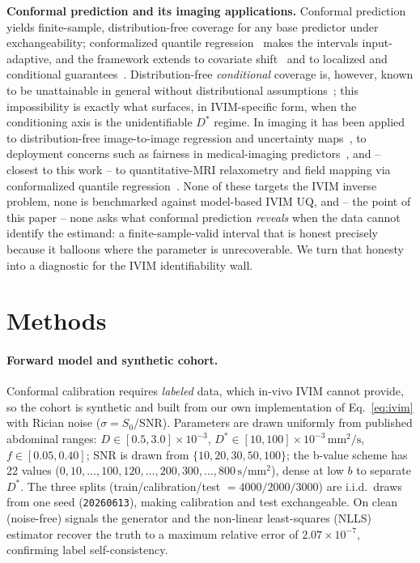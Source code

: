 \documentclass[11pt]{article}
\newcommand{\Dstar}{D^{*}}
\newcommand{\unit}[1]{\,\mathrm{#1}}
\begin{document}
\textbf{Conformal prediction and its imaging applications.} Conformal
prediction~\citep{vovk2005,lei2018,angelopoulos2023} yields finite-sample,
distribution-free coverage for any base predictor under exchangeability;
conformalized quantile regression~\citep{romano2019} makes the intervals
input-adaptive, and the framework extends to covariate
shift~\citep{tibshirani2019,barber2023} and to localized and conditional
guarantees~\citep{guan2023,gibbs2023}. Distribution-free \emph{conditional}
coverage is, however, known to be unattainable in general without distributional
assumptions~\citep{barber2021limits}; this impossibility is exactly what surfaces,
in IVIM-specific form, when the conditioning axis is the unidentifiable $\Dstar$
regime. In imaging it has been applied to
distribution-free image-to-image regression and uncertainty
maps~\citep{angelopoulos2022}, to deployment concerns such as fairness in
medical-imaging predictors~\citep{lu2022}, and -- closest to this work -- to
quantitative-MRI relaxometry and field mapping via conformalized quantile
regression~\citep{birk2024}. None of these targets the IVIM inverse problem, none
is benchmarked against model-based IVIM UQ, and -- the point of this paper -- none
asks what conformal prediction \emph{reveals} when the data cannot identify the
estimand: a finite-sample-valid interval that is honest precisely because it
balloons where the parameter is unrecoverable. We turn that honesty into a
diagnostic for the IVIM identifiability wall.

\section{Methods}
\label{sec:methods}

\paragraph{Forward model and synthetic cohort.}
Conformal calibration requires \emph{labeled} data, which in-vivo IVIM cannot
provide, so the cohort is synthetic and built from our own implementation of
Eq.~\eqref{eq:ivim} with Rician noise ($\sigma = S_0/\mathrm{SNR}$). Parameters are
drawn uniformly from published abdominal ranges: $D\in[0.5,3.0]\times10^{-3}$,
$\Dstar\in[10,100]\times10^{-3}\unit{mm^2/s}$, $f\in[0.05,0.40]$; SNR is drawn from
$\{10,20,30,50,100\}$; the b-value scheme has 22 values
($0,10,\dots,100,120,\dots,200,300,\dots,800\unit{s/mm^2}$), dense at low $b$ to
separate $\Dstar$. The three splits (train/calibration/test $=4000/2000/3000$) are
i.i.d.\ draws from one seed (\texttt{20260613}), making calibration and test
exchangeable. On clean (noise-free) signals the generator and the non-linear
least-squares (NLLS) estimator recover the truth to a maximum relative error of
$2.07\times10^{-7}$, confirming label self-consistency.
\end{document}
